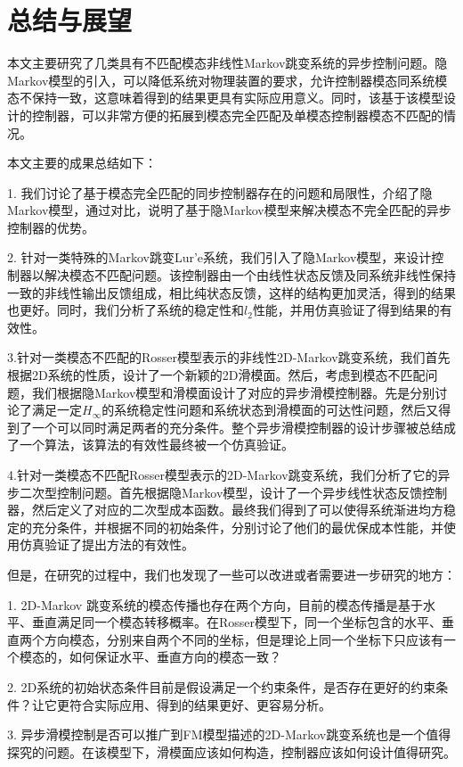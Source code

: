 
\chapter{总结与展望}
	本文主要研究了几类具有不匹配模态非线性Markov跳变系统的异步控制问题。隐Markov模型的引入，可以降低系统对物理装置的要求，允许控制器模态同系统模态不保持一致，这意味着得到的结果更具有实际应用意义。同时，该基于该模型设计的控制器，可以非常方便的拓展到模态完全匹配及单模态控制器模态不匹配的情况。
	
	本文主要的成果总结如下：
	
	1. 我们讨论了基于模态完全匹配的同步控制器存在的问题和局限性，介绍了隐Markov模型，通过对比，说明了基于隐Markov模型来解决模态不完全匹配的异步控制器的优势。
	
	2. 针对一类特殊的Markov跳变Lur'e系统，我们引入了隐Markov模型，来设计控制器以解决模态不匹配问题。该控制器由一个由线性状态反馈及同系统非线性保持一致的非线性输出反馈组成，相比纯状态反馈，这样的结构更加灵活，得到的结果也更好。同时，我们分析了系统的稳定性和$l_2$性能，并用仿真验证了得到结果的有效性。
	
	3.针对一类模态不匹配的Rosser模型表示的非线性2D-Markov跳变系统，我们首先根据2D系统的性质，设计了一个新颖的2D滑模面。然后，考虑到模态不匹配问题，我们根据隐Markov模型和滑模面设计了对应的异步滑模控制器。先是分别讨论了满足一定$H_\infty$的系统稳定性问题和系统状态到滑模面的可达性问题，然后又得到了一个可以同时满足两者的充分条件。整个异步滑模控制器的设计步骤被总结成了一个算法，该算法的有效性最终被一个仿真验证。
	
	4.针对一类模态不匹配Rosser模型表示的2D-Markov跳变系统，我们分析了它的异步二次型控制问题。首先根据隐Markov模型，设计了一个异步线性状态反馈控制器，然后定义了对应的二次型成本函数。最终我们得到了可以使得系统渐进均方稳定的充分条件，并根据不同的初始条件，分别讨论了他们的最优保成本性能，并使用仿真验证了提出方法的有效性。
	
	但是，在研究的过程中，我们也发现了一些可以改进或者需要进一步研究的地方：
	
	1. 2D-Markov 跳变系统的模态传播也存在两个方向，目前的模态传播是基于水平、垂直满足同一个模态转移概率。在Rosser模型下，同一个坐标包含的水平、垂直两个方向模态，分别来自两个不同的坐标，但是理论上同一个坐标下只应该有一个模态的，如何保证水平、垂直方向的模态一致？
	
	2. 2D系统的初始状态条件目前是假设满足一个约束条件，是否存在更好的约束条件？让它更符合实际应用、得到的结果更好、更容易分析。
	
	3. 异步滑模控制是否可以推广到FM模型描述的2D-Markov跳变系统也是一个值得探究的问题。在该模型下，滑模面应该如何构造，控制器应该如何设计值得研究。